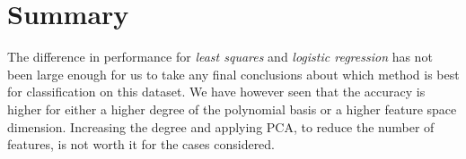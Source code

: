 \documentclass[10pt,conference,compsocconf]{IEEEtran}
\begin{document}
\section{Summary}
\label{sec:tips-writing}
  The difference in performance for \textit{least squares} and \textit{logistic regression} has not been large enough for us to take any final conclusions about which method is best for classification on this dataset. We have however seen that the accuracy is higher for either a higher degree of the polynomial basis or a higher feature space dimension. Increasing the degree and applying PCA, to reduce the number of features, is not worth it for the cases considered.



\end{document}
